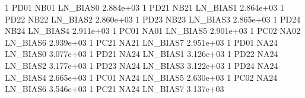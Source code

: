 1 PD01 NB01 LN_BIAS0 2.884e+03 
1 PD21 NB21 LN_BIAS1 2.864e+03 
1 PD22 NB22 LN_BIAS2 2.860e+03 
1 PD23 NB23 LN_BIAS3 2.865e+03 
1 PD24 NB24 LN_BIAS4 2.911e+03 
1 PC01 NA01 LN_BIAS5 2.901e+03 
1 PC02 NA02 LN_BIAS6 2.939e+03 
1 PC21 NA21 LN_BIAS7 2.951e+03 
1 PD01 NA24 LN_BIAS0 3.077e+03 
1 PD21 NA24 LN_BIAS1 3.126e+03 
1 PD22 NA24 LN_BIAS2 3.177e+03 
1 PD23 NA24 LN_BIAS3 3.122e+03 
1 PD24 NA24 LN_BIAS4 2.665e+03 
1 PC01 NA24 LN_BIAS5 2.630e+03 
1 PC02 NA24 LN_BIAS6 3.546e+03 
1 PC21 NA24 LN_BIAS7 3.137e+03 
